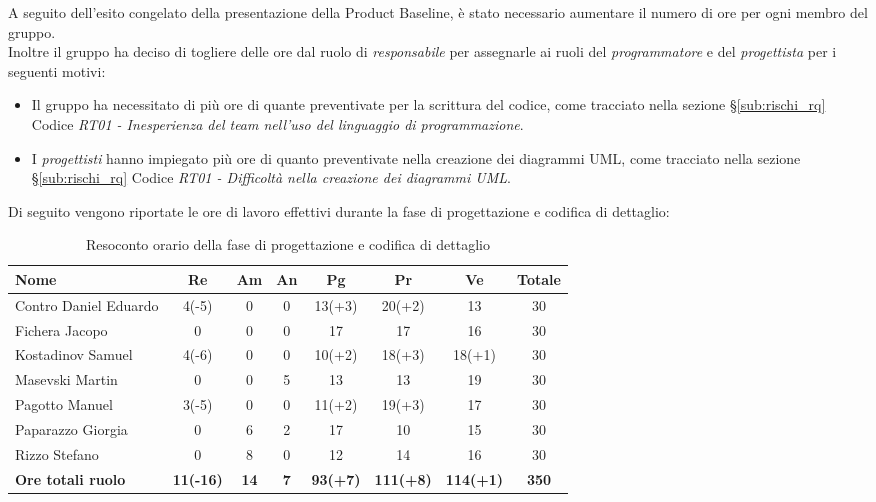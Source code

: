 \documentclass[../piano_di_progetto.tex]{subfiles}
\begin{document}
A seguito dell'esito congelato della presentazione della Product Baseline, è stato necessario aumentare il numero di ore per ogni membro del gruppo.\\
Inoltre il gruppo ha deciso di togliere delle ore dal ruolo di \emph{responsabile} per assegnarle ai ruoli del \emph{programmatore} e del \emph{progettista} per i seguenti motivi:
\begin{itemize}
	\item Il gruppo ha necessitato di più ore di quante preventivate per la scrittura del codice, come tracciato nella sezione \S\ref{sub:rischi_rq} Codice \emph{RT01 - Inesperienza del team nell'uso del linguaggio di programmazione}. %
	\item I \emph{progettisti} hanno impiegato più ore di quanto preventivate nella creazione dei diagrammi UML, come tracciato nella sezione \S\ref{sub:rischi_rq} Codice \emph{RT01 - Difficoltà nella creazione dei diagrammi UML}.
\end{itemize}

\noindent Di seguito vengono riportate le ore di lavoro effettivi durante la fase di progettazione e codifica di dettaglio: \\
\begin{table}[!ht]
	\centering
	\begin{tabular}{|l|c|c|c|c|c|c|c|}
	\hline
	\rowcolor{lightgray}
	\textbf{Nome} & \textbf{Re} & \textbf{Am} & \textbf{An} & \textbf{Pg}  & \textbf{Pr}   & \textbf{Ve} & \textbf{Totale}\\
	\hline
	Contro Daniel Eduardo & 4(-5) & 0 & 0 & 13(+3) & 20(+2) & 13 & 30 \\
	Fichera Jacopo & 0 & 0 & 0 & 17 & 17 & 16 & 30 \\
	Kostadinov Samuel & 4(-6) & 0 & 0 & 10(+2) & 18(+3) & 18(+1) & 30 \\			
	Masevski Martin & 0 & 0 & 5 & 13 & 13 & 19 & 30 \\
	Pagotto Manuel & 3(-5) & 0 & 0 & 11(+2) & 19(+3) & 17 & 30 \\			
	Paparazzo Giorgia & 0 & 6 & 2 & 17 & 10 & 15 & 30 \\
	Rizzo Stefano & 0 & 8 & 0 & 12 & 14 & 16 & 30 \\
	\hline
	\textbf{Ore totali ruolo} & \textbf{11(-16)} & \textbf{14} & \textbf{7} & \textbf{93(+7)} & \textbf{111(+8)} & \textbf{114(+1)} & \textbf{350} \\
	\hline
	\end{tabular}
	\caption{Resoconto orario della fase di progettazione e codifica di dettaglio}
\end{table}
\end{document}
